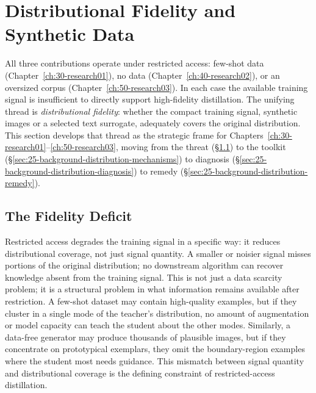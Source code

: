 \documentclass[12pt, a4paper, twoside]{book}
\numberwithin{equation}{chapter}
\theoremstyle{plain}
\theoremstyle{definition}
\theoremstyle{remark}
\newenvironment{foldable}{}{}
\begin{document}
 \section{Distributional Fidelity and Synthetic Data} \label{sec:25-background-distribution}
\begin{foldable}
  All three contributions operate under restricted access: few-shot data (Chapter~\ref{ch:30-research01}), no data (Chapter~\ref{ch:40-research02}), or an oversized corpus (Chapter~\ref{ch:50-research03}).
  In each case the available training signal is insufficient to directly support high-fidelity distillation.
  The unifying thread is \textit{distributional fidelity}: whether the compact training signal, synthetic images or a selected text surrogate, adequately covers the original distribution.
  This section develops that thread as the strategic frame for Chapters~\ref{ch:30-research01}--\ref{ch:50-research03}, moving from the threat (\S\ref{sec:25-background-distribution-deficit}) to the toolkit (\S\ref{sec:25-background-distribution-mechanisms}) to diagnosis (\S\ref{sec:25-background-distribution-diagnosis}) to remedy (\S\ref{sec:25-background-distribution-remedy}).
\end{foldable}

\subsection{The Fidelity Deficit} \label{sec:25-background-distribution-deficit}
\begin{foldable}
  Restricted access degrades the training signal in a specific way: it reduces distributional coverage, not just signal quantity.
  A smaller or noisier signal misses portions of the original distribution; no downstream algorithm can recover knowledge absent from the training signal.
  This is not just a data scarcity problem; it is a structural problem in what information remains available after restriction.
  A few-shot dataset may contain high-quality examples, but if they cluster in a single mode of the teacher's distribution, no amount of augmentation or model capacity can teach the student about the other modes.
  Similarly, a data-free generator may produce thousands of plausible images, but if they concentrate on prototypical exemplars, they omit the boundary-region examples where the student most needs guidance.
  This mismatch between signal quantity and distributional coverage is the defining constraint of restricted-access distillation.
\end{foldable}
\end{document}
